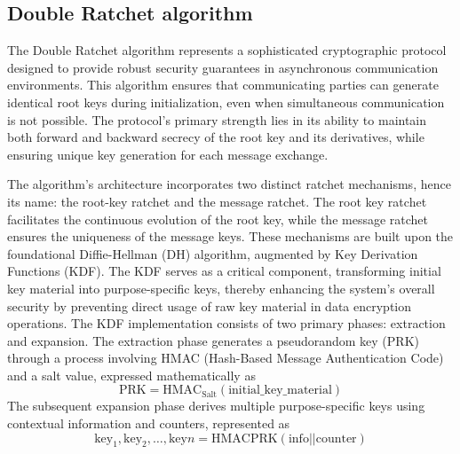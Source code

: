 \documentclass[9pt,a4paper,twoside]{rho-class/rho}
\begin{document}
\subsection{Double Ratchet algorithm}
The Double Ratchet algorithm represents a sophisticated cryptographic protocol designed to provide robust security guarantees in asynchronous communication environments. This algorithm ensures that communicating parties can generate identical root keys during initialization, even when simultaneous communication is not possible. The protocol's primary strength lies in its ability to maintain both forward and backward secrecy of the root key and its derivatives, while ensuring unique key generation for each message exchange.

The algorithm's architecture incorporates two distinct ratchet mechanisms, hence its name: the root-key ratchet and the message ratchet. The root key ratchet facilitates the continuous evolution of the root key, while the message ratchet ensures the uniqueness of the message keys. These mechanisms are built upon the foundational Diffie-Hellman (DH) algorithm, augmented by Key Derivation Functions (KDF). The KDF serves as a critical component, transforming initial key material into purpose-specific keys, thereby enhancing the system's overall security by preventing direct usage of raw key material in data encryption operations. The KDF implementation consists of two primary phases: extraction and expansion.
The extraction phase generates a pseudorandom key (PRK) through a process involving HMAC (Hash-Based Message Authentication Code) and a salt value, expressed mathematically as
\[
\text{PRK} = \text{HMAC}_{\text{Salt}}(\text{initial\_key\_material})
\]
The subsequent expansion phase derives multiple purpose-specific keys using contextual information and counters, represented as
\[
\text{key}_1, \text{key}_2, \dots, \text{key}n = \text{HMAC}{\text{PRK}}(\text{info} || \text{counter})
\]
\end{document}

